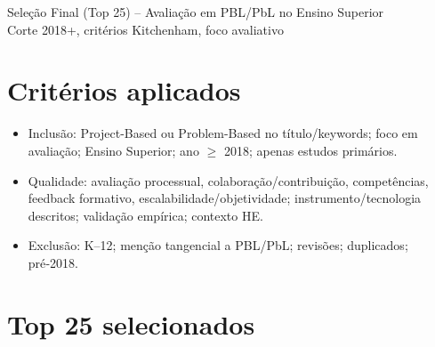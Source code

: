 \documentclass[11pt,a4paper]{article}
\begin{document}
\begin{center}
{\LARGE Seleção Final (Top 25) – Avaliação em PBL/PbL no Ensino Superior}\\[6pt]
{\large Corte 2018+, critérios Kitchenham, foco avaliativo}
\end{center}

\section*{Critérios aplicados}
\begin{itemize}
  \item Inclusão: Project-Based ou Problem-Based no título/keywords; foco em avaliação; Ensino Superior; ano $\ge$ 2018; apenas estudos primários.
  \item Qualidade: avaliação processual, colaboração/contribuição, competências, feedback formativo, escalabilidade/objetividade; instrumento/tecnologia descritos; validação empírica; contexto HE.
  \item Exclusão: K–12; menção tangencial a PBL/PbL; revisões; duplicados; pré‑2018.
\end{itemize}

\section*{Top 25 selecionados}
\end{document}
